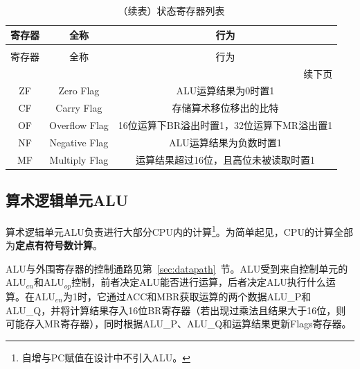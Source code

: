 \documentclass[lang=cn,a4paper,newtx]{elegantpaper}
\begin{document}
\begin{longtable}{c c c}
  \caption{状态寄存器列表} \label{tab:CPU:status} \\
  \toprule
  寄存器 & 全称 & 行为 \\ 
  \midrule
  \endfirsthead

  \caption[]{（续表）状态寄存器列表} \\
  \toprule
  寄存器 & 全称 & 行为\\
  \midrule
  \endhead

  \midrule
  \multicolumn{3}{r}{续下页} \\
  \midrule
  \endfoot

  \bottomrule
  \endlastfoot

  ZF   & Zero Flag             & ALU运算结果为0时置1\\
  CF  & Carry Flag     & 存储算术移位移出的比特 \\
  OF  & Overflow Flag &  16位运算下BR溢出时置1，32位运算下MR溢出置1\\
  NF  & Negative Flag &  ALU运算结果为负数时置1\\
  MF & Multiply Flag & 运算结果超过16位，且高位未被读取时置1\\
\end{longtable}
\subsection{算术逻辑单元ALU}
算术逻辑单元ALU负责进行大部分CPU内的计算\footnote{自增与PC赋值在设计中不引入ALU。}。为简单起见，CPU的计算全部为\textbf{定点有符号数计算}。

ALU与外围寄存器的控制通路见第~\ref{sec:datapath}~节。ALU受到来自控制单元的$\text{ALU}_{en}$和$\text{ALU}_{op}$控制，前者决定ALU能否进行运算，后者决定ALU执行什么运算。在$\text{ALU}_{en}$为1时，它通过ACC和MBR获取运算的两个数据ALU\_P和ALU\_Q，并将计算结果存入16位BR寄存器（若出现过乘法且结果大于16位，则可能存入MR寄存器），同时根据ALU\_P、ALU\_Q和运算结果更新Flags寄存器。
\end{document}
